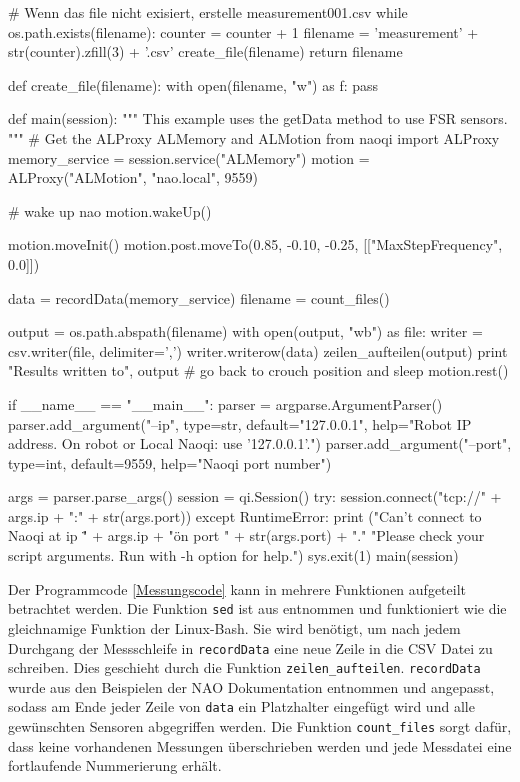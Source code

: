 \begin{python} [caption={Pythonprogramm für Messaufnahmen}, label=Messungscode]
			# Wenn das file nicht exisiert, erstelle measurement001.csv
			while os.path.exists(filename):
				counter = counter + 1
				filename = 'measurement' + str(counter).zfill(3) + '.csv'
			create_file(filename)
			return filename
		
		
		def create_file(filename):
			with open(filename, "w") as f:
				pass
		
		
		def main(session):
			"""
			This example uses the getData method to use FSR sensors.
			"""
			# Get the ALProxy ALMemory and ALMotion
			from naoqi import ALProxy
			memory_service = session.service("ALMemory")
			motion = ALProxy("ALMotion", "nao.local", 9559)
			
			# wake up nao
			motion.wakeUp()
			
			motion.moveInit()
			motion.post.moveTo(0.85, -0.10, -0.25, [["MaxStepFrequency", 0.0]])
			
			data = recordData(memory_service)
			filename = count_files()
			
			output = os.path.abspath(filename)
			with open(output, "wb") as file:
				writer = csv.writer(file, delimiter=',')
				writer.writerow(data)
			zeilen_aufteilen(output)
			print "Results written to", output
			# go back to crouch position and sleep
			motion.rest()
			
		
		if __name__ == "__main__":
			parser = argparse.ArgumentParser()
			parser.add_argument("--ip", type=str, default="127.0.0.1",
			help="Robot IP address. On robot or Local Naoqi: use '127.0.0.1'.")
			parser.add_argument("--port", type=int, default=9559,
			help="Naoqi port number")
			
			args = parser.parse_args()
			session = qi.Session()
			try:
				session.connect("tcp://" + args.ip + ":" + str(args.port))
			except RuntimeError:
				print ("Can't connect to Naoqi at ip \"" + args.ip + "\" on port " + str(args.port) + ".\n"
				"Please check your script arguments. Run with -h option for help.")
			sys.exit(1)
			main(session)	
	\end{python}
Der Programmcode \ref{Messungscode} kann in mehrere Funktionen aufgeteilt betrachtet werden. Die Funktion \texttt{sed} ist aus \cite{sed_python} entnommen und funktioniert wie die gleichnamige Funktion der Linux-Bash. Sie wird benötigt, um nach jedem Durchgang der Messschleife in \texttt{recordData} eine neue Zeile in die CSV Datei zu schreiben. Dies geschieht durch die Funktion \texttt{zeilen\_aufteilen}. \texttt{recordData} wurde aus den Beispielen der NAO Dokumentation \cite[/Other tutorials/Python SDK - Tutorials/Python SDK - Examples/Sensors]{naoqi_dev_guide} entnommen und angepasst, sodass am Ende jeder Zeile von \texttt{data} ein Platzhalter eingefügt wird und alle gewünschten Sensoren abgegriffen werden. Die Funktion \texttt{count\_files} sorgt dafür, dass keine vorhandenen Messungen überschrieben werden und jede Messdatei eine fortlaufende Nummerierung erhält. 

